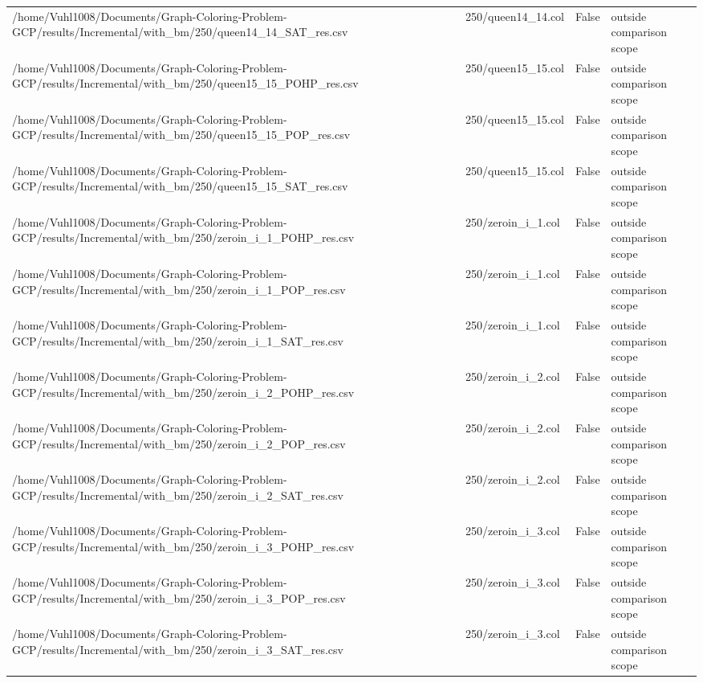 \begin{table}[htbp]
\begin{tabular}{llll}
/home/Vuhl1008/Documents/Graph-Coloring-Problem-GCP/results/Incremental/with\_bm/250/queen14\_14\_SAT\_res.csv & 250/queen14\_14.col & False & outside comparison scope \\
/home/Vuhl1008/Documents/Graph-Coloring-Problem-GCP/results/Incremental/with\_bm/250/queen15\_15\_POHP\_res.csv & 250/queen15\_15.col & False & outside comparison scope \\
/home/Vuhl1008/Documents/Graph-Coloring-Problem-GCP/results/Incremental/with\_bm/250/queen15\_15\_POP\_res.csv & 250/queen15\_15.col & False & outside comparison scope \\
/home/Vuhl1008/Documents/Graph-Coloring-Problem-GCP/results/Incremental/with\_bm/250/queen15\_15\_SAT\_res.csv & 250/queen15\_15.col & False & outside comparison scope \\
/home/Vuhl1008/Documents/Graph-Coloring-Problem-GCP/results/Incremental/with\_bm/250/zeroin\_i\_1\_POHP\_res.csv & 250/zeroin\_i\_1.col & False & outside comparison scope \\
/home/Vuhl1008/Documents/Graph-Coloring-Problem-GCP/results/Incremental/with\_bm/250/zeroin\_i\_1\_POP\_res.csv & 250/zeroin\_i\_1.col & False & outside comparison scope \\
/home/Vuhl1008/Documents/Graph-Coloring-Problem-GCP/results/Incremental/with\_bm/250/zeroin\_i\_1\_SAT\_res.csv & 250/zeroin\_i\_1.col & False & outside comparison scope \\
/home/Vuhl1008/Documents/Graph-Coloring-Problem-GCP/results/Incremental/with\_bm/250/zeroin\_i\_2\_POHP\_res.csv & 250/zeroin\_i\_2.col & False & outside comparison scope \\
/home/Vuhl1008/Documents/Graph-Coloring-Problem-GCP/results/Incremental/with\_bm/250/zeroin\_i\_2\_POP\_res.csv & 250/zeroin\_i\_2.col & False & outside comparison scope \\
/home/Vuhl1008/Documents/Graph-Coloring-Problem-GCP/results/Incremental/with\_bm/250/zeroin\_i\_2\_SAT\_res.csv & 250/zeroin\_i\_2.col & False & outside comparison scope \\
/home/Vuhl1008/Documents/Graph-Coloring-Problem-GCP/results/Incremental/with\_bm/250/zeroin\_i\_3\_POHP\_res.csv & 250/zeroin\_i\_3.col & False & outside comparison scope \\
/home/Vuhl1008/Documents/Graph-Coloring-Problem-GCP/results/Incremental/with\_bm/250/zeroin\_i\_3\_POP\_res.csv & 250/zeroin\_i\_3.col & False & outside comparison scope \\
/home/Vuhl1008/Documents/Graph-Coloring-Problem-GCP/results/Incremental/with\_bm/250/zeroin\_i\_3\_SAT\_res.csv & 250/zeroin\_i\_3.col & False & outside comparison scope \\

\end{tabular}
\end{table}
